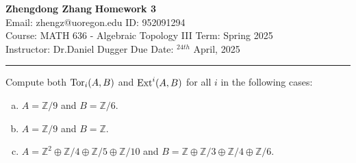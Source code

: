 \documentclass[a4paper, 12pt]{article}
\begin{document}
\noindent
\large\textbf{Zhengdong Zhang} \hfill \textbf{Homework 3}   \\
Email: zhengz@uoregon.edu \hfill ID: 952091294 \\
\normalsize Course: MATH 636 - Algebraic Topology III \hfill Term: Spring 2025\\
Instructor: Dr.Daniel Dugger \hfill Due Date: $^{24th}$ April, 2025 \\
\noindent\rule{7in}{2.8pt}

\begin{problem}{1}
Compute both \(\text{Tor}_i(A,B)\) and \(\text{Ext}^i(A,B)\) for all \(i\) in the following cases: 
\begin{enumerate}[(a)]
\item \(A=\mathbb{Z}/9\) and \(B=\mathbb{Z}/6\).
\item \(A=\mathbb{Z}/9\) and \(B=\mathbb{Z}\).
\item \(A=\mathbb{Z}^2\oplus \mathbb{Z}/4\oplus \mathbb{Z}/5\oplus \mathbb{Z}/10\) and \(B=\mathbb{Z}\oplus \mathbb{Z}/3\oplus \mathbb{Z}/4\oplus \mathbb{Z}/6\).
\end{enumerate}
\end{problem}
\begin{solution}

\end{solution}
\end{document}
